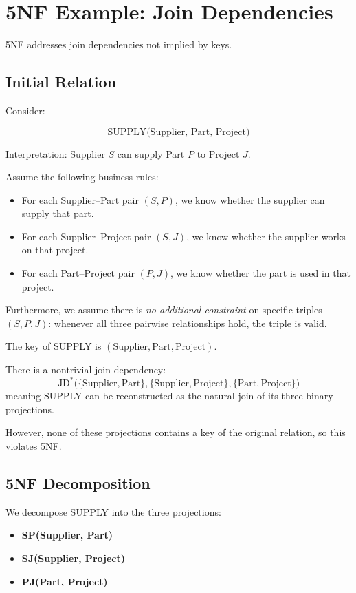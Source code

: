\documentclass{article}
\begin{document}
\clearpage
\section*{5NF Example: Join Dependencies}

5NF addresses join dependencies not implied by keys.

\subsection*{Initial Relation}

Consider:

\[
\text{SUPPLY(Supplier, Part, Project)}
\]

Interpretation:
Supplier $S$ can supply Part $P$ to Project $J$.

Assume the following business rules:
\begin{itemize}
  \item For each Supplier--Part pair $(S,P)$, we know whether the supplier can supply that part.
  \item For each Supplier--Project pair $(S,J)$, we know whether the supplier works on that project.
  \item For each Part--Project pair $(P,J)$, we know whether the part is used in that project.
\end{itemize}

Furthermore, we assume there is \emph{no additional constraint} on specific triples
$(S,P,J)$: whenever all three pairwise relationships hold, the triple
is valid.

The key of SUPPLY is $(\text{Supplier},\text{Part},\text{Project})$.

There is a nontrivial join dependency:
\[
\text{JD}^\ast\bigl(
  \{\text{Supplier},\text{Part}\},
  \{\text{Supplier},\text{Project}\},
  \{\text{Part},\text{Project}\}
\bigr)
\]
meaning SUPPLY can be reconstructed as the natural join of its three
binary projections.

However, none of these projections contains a key of the original
relation, so this violates 5NF.

\subsection*{5NF Decomposition}

We decompose SUPPLY into the three projections:

\begin{itemize}
  \item \textbf{SP(Supplier, Part)}
  \item \textbf{SJ(Supplier, Project)}
  \item \textbf{PJ(Part, Project)}
\end{itemize}
\end{document}
